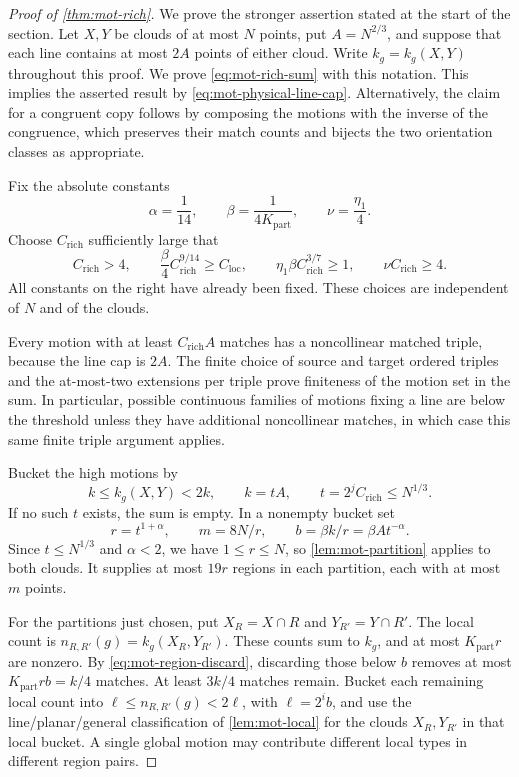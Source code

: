 \begin{proof}[Proof of \cref{thm:mot-rich}]
We prove the stronger assertion stated at the start of the section. Let $X,Y$ be clouds of at most $N$ points, put $A=N^{2/3}$, and suppose that each line contains at most $2A$ points of either cloud. Write $k_g=k_g(X,Y)$ throughout this proof.  We prove \eqref{eq:mot-rich-sum} with this notation.  This implies the asserted result by \eqref{eq:mot-physical-line-cap}.  Alternatively, the claim for a congruent copy follows by composing the motions with the inverse of the congruence, which preserves their match counts and bijects the two orientation classes as appropriate.

Fix the absolute constants
\[
 \alpha=\frac1{14},\qquad
 \beta=\frac1{4K_{\mathrm{part}}},\qquad
 \nu=\frac{\eta_1}{4}.
\]
Choose $C_{\mathrm{rich}}$ sufficiently large that
\begin{equation}
\label{eq:mot-constant-choices}
 C_{\mathrm{rich}}>4,\qquad
 \frac\beta4 C_{\mathrm{rich}}^{9/14}
      \ge C_{\mathrm{loc}},\qquad
 \eta_1\beta C_{\mathrm{rich}}^{3/7}\ge1,\qquad
 \nu C_{\mathrm{rich}}\ge4.
\end{equation}
All constants on the right have already been fixed.  These choices are independent of $N$ and of the clouds.

Every motion with at least $C_{\mathrm{rich}}A$ matches has a noncollinear matched triple, because the line cap is $2A$. The finite choice of source and target ordered triples and the at-most-two extensions per triple prove finiteness of the motion set in the sum.  In particular, possible continuous families of motions fixing a line are below the threshold unless they have additional noncollinear matches, in which case this same finite triple argument applies.

Bucket the high motions by
\[
 k\le k_g(X,Y)<2k,\qquad
 k=tA,\qquad t=2^jC_{\mathrm{rich}}\le N^{1/3}.
\]
If no such $t$ exists, the sum is empty.  In a nonempty bucket set
\begin{equation}
\label{eq:mot-subdivision-parameters}
 r=t^{1+\alpha},\qquad
 m=8N/r,\qquad
 b=\beta k/r=\beta A t^{-\alpha}.
\end{equation}
Since $t\le N^{1/3}$ and $\alpha<2$, we have $1\le r\le N$, so \cref{lem:mot-partition} applies to both clouds.  It supplies at most $19r$ regions in each partition, each with at most $m$ points.

For the partitions just chosen, put $X_R=X\cap R$ and $Y_{R'}=Y\cap R'$.  The local count is $n_{R,R'}(g)=k_g(X_R,Y_{R'})$.  These counts sum to $k_g$, and at most $K_{\mathrm{part}}r$ are nonzero.  By \eqref{eq:mot-region-discard}, discarding those below $b$ removes at most $K_{\mathrm{part}}rb=k/4$ matches.  At least $3k/4$ matches remain. Bucket each remaining local count into $\ell\le n_{R,R'}(g)<2\ell$, with $\ell=2^i b$, and use the line/planar/general classification of \cref{lem:mot-local} for the clouds $X_R,Y_{R'}$ in that local bucket.  A single global motion may contribute different local types in different region pairs.


\end{proof}
